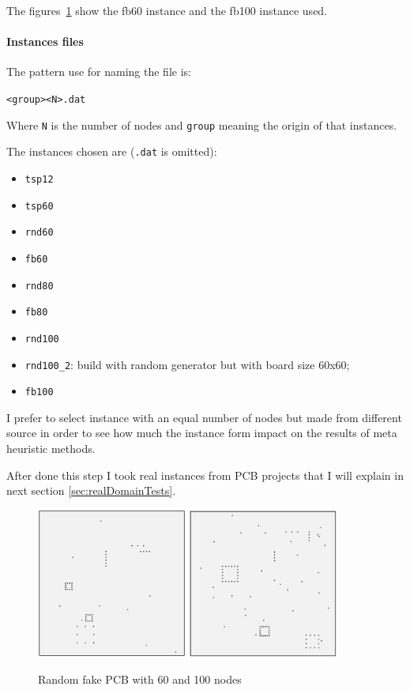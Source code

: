 	The figures~\ref{fig:fakeBoards} show the fb60 instance and the fb100 instance used.
	
\newpage
	\paragraph{Instances files}
	The pattern use for naming the file is:
	\begin{center}
		\verb|<group><N>.dat|
	\end{center}
	Where \verb|N| is the number of nodes and \verb|group| meaning the origin of that instances.
	
	The instances chosen are (\verb|.dat| is omitted):
	\begin{itemize}
		\item \verb|tsp12|
		\item \verb|tsp60|
		\item \verb|rnd60|
		\item \verb|fb60|
		\item \verb|rnd80|
		\item \verb|fb80|
		\item \verb|rnd100|
		\item \verb|rnd100_2|: build with random generator but with board size 60x60;
		\item \verb|fb100|
	\end{itemize}
	I prefer to select instance with an equal number of nodes but made from different source in order to see how much the instance form impact on the results of meta heuristic methods.
	
	After done this step I took real instances from PCB projects that I will explain in next section \ref{sec:realDomainTests}. 

	\begin{figure}[hb]
		\centering
		\includegraphics[width=0.44\textwidth]{img/fb60}%
		\qquad\qquad
		\includegraphics[width=0.44\textwidth]{img/fb100}
		\caption{Random fake PCB with 60 and 100 nodes}
		\label{fig:fakeBoards}
	\end{figure}

